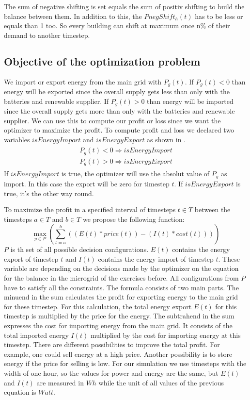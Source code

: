 The sum of negative shifting is set equals the sum of positiv shifting to build the balance between them.
In addition to this, the $PnegShift_h(t)$ has to be less or equals than 1 too.
So every building can shift at maximum once  n\% of their demand to another timestep.

\subsection{Objective of the optimization problem}
We import or export energy from the main grid with $P_{g}(t)$.
If $P_{g}(t) < 0$ than energy will be exported since the overall supply gets less than only with the batteries and renewable supplier.
If $P_{g}(t) > 0$ than energy will be imported since the overall supply gets more than only with the batteries and renewable supplier.
We can use this to compute our profit or loss since we want the optimizer to maximize the profit.
To compute profit and loss we declared two variables $isEnergyImport$ and $isEnergyExport$ as shown in .
\begin{align} \label{eq:importexport}
\begin{split}
P_{g}(t) < 0 \Rightarrow isEnergyImport\\
P_{g}(t) > 0 \Rightarrow isEnergyExport
\end{split}
\end{align}
If $isEnergyImport$ is true, the optimizer will use the absolut value of $P_{g}$ as import.
In this case the export will be zero for timestep $t$.
If $isEnergyExport$ is true, it's the other way round.


To maximize the profit in a specified interval of timesteps $t \in T$ between the timesteps $a \in T$ and $b \in T$ we propose the following function:
\begin{equation} \label{eq:opt}
\max_{p \in P}{(\sum_{t=a}^{b}{((E(t)*price(t))-(I(t)*cost(t)))})}
\end{equation}
$P$ is th set of all possible decision configurations.
$E(t)$ contains the energy export of timestep $t$ and $I(t)$ contains the energy import of timestep $t$.
These variable are depending on the decisions made by the optimizer on the equation for the balance in the microgrid of the exercises before. 
All configurations from $P$ have to satisfy all the constraints. 
The formula consists of two main parts. 
The minuend in the sum calculates the profit for exporting energy to the main grid for these timestep. 
For this calculation, the total energy export $E(t)$ for this timestep is multiplied by the price for the energy. 
The subtrahend in the sum expresses the cost for importing energy from the main grid. 
It consists of the total imported energy $I(t)$ multiplied by the cost for importing energy at this timestep. 
There are different possibilities to improve the total profit. 
For example, one could sell energy at a high price. 
Another possibility is to store energy if the price for selling is low. 
For our simulation we use timesteps with the width of one hour, so the values for power and energy are the same, but $E(t)$ and $I(t)$ are measured in $Wh$ while the unit of all values of the previous equation is $Watt$.

